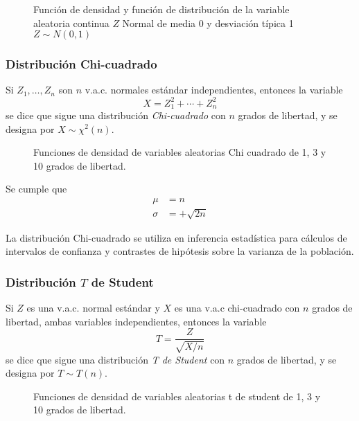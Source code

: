 \begin{figure}[h!]
\centering {}\qquad
{}
\caption{Función de densidad y función de distribución de la
variable aleatoria continua $Z$ Normal de media 0 y desviación
típica 1 \,\, $Z\sim N(0,1)$} \label{g:graficasvac}
\end{figure}

\subsubsection{Distribución Chi-cuadrado}
Si $Z_1,\ldots,Z_n$ son $n$ v.a.c. normales estándar independientes, entonces la variable
\[ X=Z_1^2+\cdots+Z_n^2\]
se dice que sigue una distribución \emph{Chi-cuadrado} con $n$
grados de libertad, y se designa por $X\sim\chi^2(n)$.

\begin{figure}[h!]
\centering
\scalebox{0.8}{} 
\caption{Funciones de densidad de variables aleatorias Chi cuadrado de 1, 3 y 10 grados de libertad.}
\label{g:chicuadrado}
\end{figure}

Se cumple que
\begin{align*}
\mu &= n\\
\sigma &=+\sqrt{2n}
\end{align*}

La distribución Chi-cuadrado se utiliza en inferencia estadística para cálculos de intervalos de confianza y contrastes de hipótesis sobre la varianza de la población.

\subsubsection{Distribución $T$ de Student}
Si $Z$ es una v.a.c. normal estándar y $X$ es una v.a.c chi-cuadrado con $n$ grados de libertad, ambas variables independientes, entonces la variable
\[
T=\frac{Z}{\sqrt{X/n}}
\]
se dice que sigue una distribución \emph{T de Student} con $n$
grados de libertad, y se designa por $T\sim T(n)$.

\begin{figure}[h!]
\centering
\scalebox{0.8}{} 
\caption{Funciones de densidad de variables aleatorias t de student de 1, 3 y 10 grados de libertad.}
\label{g:tstudent}
\end{figure}

